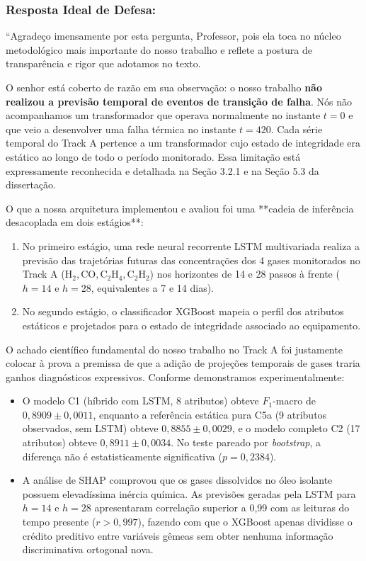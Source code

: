 \documentclass[11pt,a4paper]{article}
\begin{document}
\subsubsection{Resposta Ideal de Defesa:}
``Agradeço imensamente por esta pergunta, Professor, pois ela toca no núcleo metodológico mais importante do nosso trabalho e reflete a postura de transparência e rigor que adotamos no texto.

O senhor está coberto de razão em sua observação: o nosso trabalho \textbf{não realizou a previsão temporal de eventos de transição de falha}. Nós não acompanhamos um transformador que operava normalmente no instante $t=0$ e que veio a desenvolver uma falha térmica no instante $t=420$. Cada série temporal do Track A pertence a um transformador cujo estado de integridade era estático ao longo de todo o período monitorado. Essa limitação está expressamente reconhecida e detalhada na Seção 3.2.1 e na Seção 5.3 da dissertação.

O que a nossa arquitetura implementou e avaliou foi uma **cadeia de inferência desacoplada em dois estágios**:
\begin{enumerate}[leftmargin=*]
  \item No primeiro estágio, uma rede neural recorrente LSTM multivariada realiza a previsão das trajetórias futuras das concentrações dos 4 gases monitorados no Track A ($\text{H}_2, \text{CO}, \text{C}_2\text{H}_4, \text{C}_2\text{H}_2$) nos horizontes de 14 e 28 passos à frente ($h=14$ e $h=28$, equivalentes a 7 e 14 dias).
  \item No segundo estágio, o classificador XGBoost mapeia o perfil dos atributos estáticos e projetados para o estado de integridade associado ao equipamento.
\end{enumerate}

O achado científico fundamental do nosso trabalho no Track A foi justamente colocar à prova a premissa de que a adição de projeções temporais de gases traria ganhos diagnósticos expressivos. Conforme demonstramos experimentalmente:
\begin{itemize}[leftmargin=*]
  \item O modelo C1 (híbrido com LSTM, 8 atributos) obteve $F_1$-macro de $0{,}8909 \pm 0{,}0011$, enquanto a referência estática pura C5a (9 atributos observados, sem LSTM) obteve $0{,}8855 \pm 0{,}0029$, e o modelo completo C2 (17 atributos) obteve $0{,}8911 \pm 0{,}0034$. No teste pareado por \textit{bootstrap}, a diferença não é estatisticamente significativa ($p = 0{,}2384$).
  \item A análise de SHAP comprovou que os gases dissolvidos no óleo isolante possuem elevadíssima inércia química. As previsões geradas pela LSTM para $h=14$ e $h=28$ apresentaram correlação superior a 0,99 com as leituras do tempo presente ($r > 0{,}997$), fazendo com que o XGBoost apenas dividisse o crédito preditivo entre variáveis gêmeas sem obter nenhuma informação discriminativa ortogonal nova.
\end{itemize}
\end{document}
